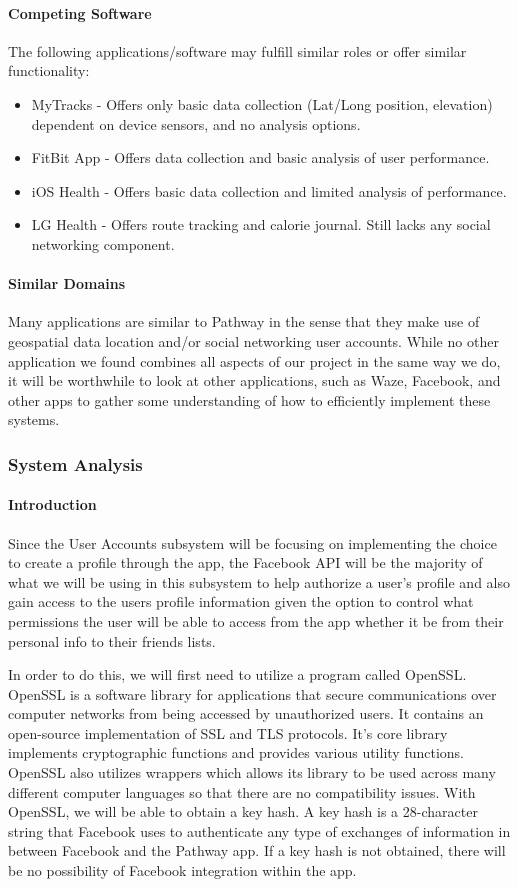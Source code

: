 ﻿\documentclass{article}
\begin{document}
\paragraph{Competing Software}
The following applications/software may fulfill similar roles or offer similar functionality:
\begin{itemize}
    \item MyTracks - Offers only basic data collection (Lat/Long position, elevation) dependent on device sensors, and no analysis options.
    \item FitBit App - Offers data collection and basic analysis of user performance.
    \item iOS Health - Offers basic data collection and limited analysis of performance.
    \item LG Health - Offers route tracking and calorie journal. Still lacks any social networking component.
\end{itemize}

\paragraph{Similar Domains}
Many applications are similar to Pathway in the sense that they make use of geospatial data location and/or social networking user accounts. While no other application we found combines all aspects of our project in the same way we do, it will be worthwhile to look at other applications, such as Waze, Facebook, and other apps to gather some understanding of how to efficiently implement these systems.

\subsubsection{System Analysis}
\paragraph{Introduction}
Since the User Accounts subsystem will be focusing on implementing the choice to create a profile through the app, the Facebook API will be the majority of what we will be using in this subsystem to help authorize a user’s profile and also gain access to the users profile information given the option to control what permissions the user will be able to access from the app whether it be from their personal info to their friends lists.

In order to do this, we will first need to utilize a program called OpenSSL. OpenSSL is a software library for applications that secure communications over computer networks from being accessed by unauthorized users. It contains an open-source implementation of SSL and TLS protocols. It's core library implements cryptographic functions and provides various utility functions. OpenSSL also utilizes wrappers which allows its library to be used across many different computer languages so that there are no compatibility issues. With OpenSSL, we will be able to obtain a key hash. A key hash is a 28-character string that Facebook uses to authenticate any type of exchanges of information in between Facebook and the Pathway app. If a key hash is not obtained, there will be no possibility of Facebook integration within the app.
\end{document}
